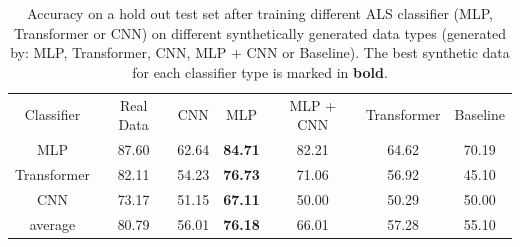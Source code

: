 \begin{table}
  \centering
  \caption{Accuracy on a hold out test set after training different ALS classifier (MLP, Transformer or CNN)  on different synthetically generated data types (generated by: MLP, Transformer, CNN, MLP + CNN or Baseline). The best synthetic data for each classifier type is marked in \textbf{bold}.}
  \label{Fig:cls}
  \begin{tabular}{c|cccccc}
    \toprule
Classifier & Real Data  & CNN  & MLP  & MLP + CNN & Transformer & Baseline \\
 
   \cmidrule(r){1-7} 
MLP &  87.60 & 62.64 & \textbf{84.71} & 82.21 & 64.62 & 70.19 \\
Transformer & 82.11  & 54.23 &  \textbf{76.73} & 71.06 & 56.92 & 45.10 \\
CNN &  73.17 & 51.15 & \textbf{67.11} & 50.00 & 50.29 & 50.00 \\
\cmidrule(r){1-7} 
average & 80.79 & 56.01 & \textbf{76.18} & 66.01 & 57.28 & 55.10\\
    \bottomrule
  \end{tabular}
\end{table}




 



